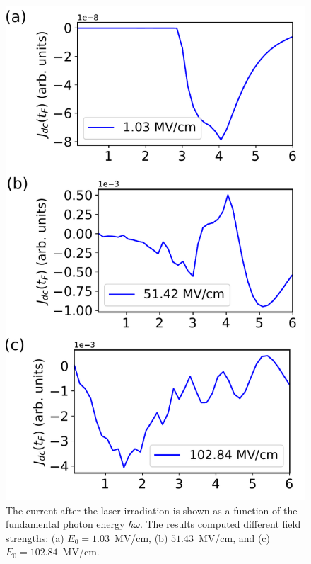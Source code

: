 \begin{figure}[htbp]
\centering
\includegraphics[width=0.8\linewidth]{pic/frequency.pdf}
\caption{\label{fig:fig4} 
The current after the laser irradiation is shown as a function of the fundamental photon energy $\hbar \omega$. The results computed different field strengths: (a) $E_0=1.03$~MV/cm, (b) $51.43$~MV/cm, and (c) $E_0=102.84$~MV/cm.}
\end{figure}

